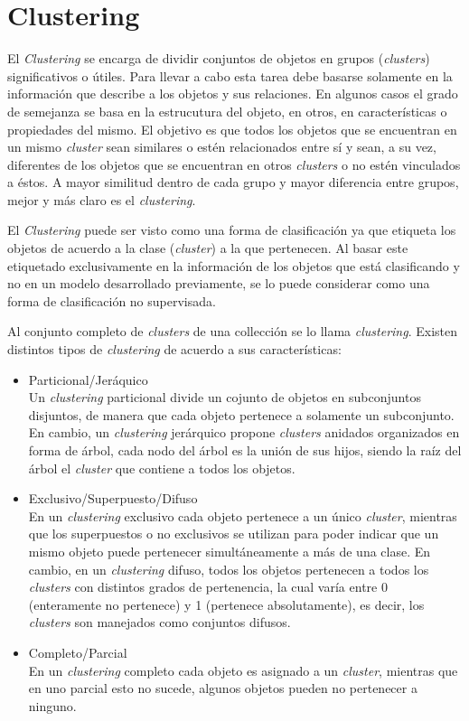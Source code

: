\section{Clustering}

El \textit{Clustering} se encarga de dividir conjuntos de objetos en grupos (\textit{clusters}) significativos
o útiles. Para llevar a cabo esta tarea debe basarse solamente en la información que describe
a los objetos y sus relaciones. En algunos casos el grado de semejanza se basa en la estrucutura del objeto, en
otros, en características o propiedades del mismo. El objetivo es que todos los objetos que se encuentran en un
mismo \textit{cluster} sean similares o estén relacionados entre sí y sean, a su vez, diferentes de los objetos
que se encuentran en otros \textit{clusters} o no estén vinculados a éstos. A mayor similitud dentro de cada grupo
y mayor diferencia entre grupos, mejor y más claro es el \textit{clustering}. 

El \textit{Clustering} puede ser visto como una forma de clasificación ya que etiqueta los objetos de acuerdo a la
clase (\textit{cluster}) a la que pertenecen. Al basar este etiquetado exclusivamente en la información de los
objetos que está clasificando y no en un modelo desarrollado previamente, se lo puede considerar como una forma
de clasificación no supervisada.

Al conjunto completo de \textit{clusters} de una collección se lo llama \textit{clustering}. Existen distintos
tipos de \textit{clustering} de acuerdo a sus características:

\begin{itemize}
 \item Particional/Jeráquico \\
 Un \textit{clustering} particional divide un cojunto de objetos en subconjuntos disjuntos, de manera que cada
 objeto pertenece a solamente un subconjunto. En cambio, un \textit{clustering} jerárquico propone \textit{clusters}
 anidados organizados en forma de árbol, cada nodo del árbol es la unión de sus hijos, siendo la raíz del árbol
 el \textit{cluster} que contiene a todos los objetos.
 \item Exclusivo/Superpuesto/Difuso \\
 En un \textit{clustering} exclusivo cada objeto pertenece a un único \textit{cluster}, mientras que los
 superpuestos o no exclusivos se utilizan para poder indicar que un mismo objeto puede pertenecer simultáneamente
 a más de una clase. En cambio, en un \textit{clustering} difuso, todos los objetos pertenecen a todos los \textit{clusters}
 con distintos grados de pertenencia, la cual varía entre 0 (enteramente no pertenece) y 1 (pertenece absolutamente),
 es decir, los \textit{clusters} son manejados como conjuntos difusos.
 \item Completo/Parcial \\
 En un \textit{clustering} completo cada objeto es asignado a un \textit{cluster}, mientras que en uno parcial
 esto no sucede, algunos objetos pueden no pertenecer a ninguno.
\end{itemize}

